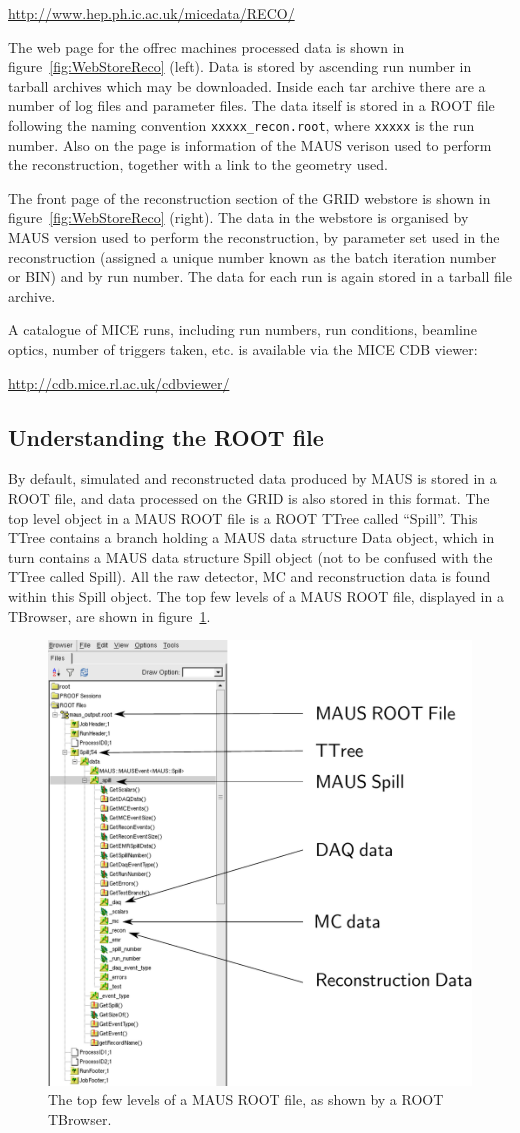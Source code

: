 \documentclass[a4paper,10pt]{article}
\begin{document}
  \url{http://www.hep.ph.ic.ac.uk/micedata/RECO/}

  The web page for the offrec machines processed data is shown in figure~\ref{fig:WebStoreReco} (left). Data is stored by ascending run number in tarball archives which may be downloaded.  Inside each tar archive there are a number of log files and parameter files. The data itself is stored in a ROOT file following the naming convention \texttt{xxxxx\_recon.root}, where \texttt{xxxxx} is the run number. Also on the page is information of the MAUS verison used to perform the reconstruction, together with a link to the geometry used.

  The front page of the reconstruction section of the GRID  webstore is shown in figure~\ref{fig:WebStoreReco} (right). The data in the webstore is organised by MAUS version used to perform the reconstruction, by parameter set used in the reconstruction (assigned a unique number known as the batch iteration number or BIN) and by run number. The data for each run is again stored in a tarball file archive.

  A catalogue of MICE runs, including run numbers, run conditions, beamline optics, number of triggers taken, etc. is available via the MICE CDB viewer:

  \url{http://cdb.mice.rl.ac.uk/cdbviewer/}

  \subsection{Understanding the ROOT file}
  By default, simulated and reconstructed data produced by MAUS is stored in a ROOT file, and data processed on the GRID is also stored in this format.  The top level object in a MAUS ROOT file is a ROOT TTree called ``Spill''. This TTree contains a branch holding a MAUS data structure Data object, which in turn contains a MAUS data structure Spill object (not to be confused with the TTree called Spill).  All the raw detector, MC and reconstruction data is found within this Spill object.  The top few levels of a MAUS ROOT file, displayed in a TBrowser, are shown in figure~\ref{fig:TBrowser}.

  \begin{figure}[tb]
    \begin{center}
      \includegraphics[width=0.5\linewidth]{./graphics/TBrowser.pdf}
      \caption{The top few levels of a MAUS ROOT file, as shown by a ROOT TBrowser.}
      \label{fig:TBrowser}
    \end{center}
  \end{figure}
\end{document}

